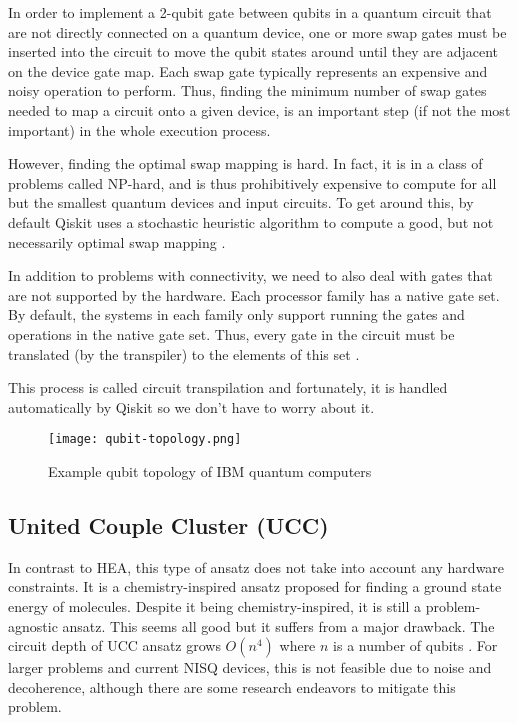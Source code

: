 In order to implement a 2-qubit gate between qubits in a quantum circuit that are not directly connected on a quantum device, one or more swap gates must be inserted into the circuit to move the qubit states around until they are adjacent on the device gate map. Each swap gate typically represents an expensive and noisy operation to perform. Thus, finding the minimum number of swap gates needed to map a circuit onto a given device, is an important step (if not the most important) in the whole execution process.

However, finding the optimal swap mapping is hard. In fact, it is in a class of problems called NP-hard, and is thus prohibitively expensive to compute for all but the smallest quantum devices and input circuits. To get around this, by default Qiskit uses a stochastic heuristic algorithm to compute a good, but not necessarily optimal swap mapping \cite{transpiler}. 

In addition to problems with connectivity, we need to also deal with gates that are not supported by the hardware. Each processor family has a native gate set. By default, the systems in each family only support running the gates and operations in the native gate set. Thus, every gate in the circuit must be translated (by the transpiler) to the elements of this set \cite{native_gates}.

This process is called circuit transpilation and fortunately, it is handled automatically by Qiskit so we don't have to worry about it. 
\begin{figure}[H]
    \texttt{[image: qubit-topology.png]}
    \caption{Example qubit topology of IBM quantum computers}
\end{figure}



\subsection{United Couple Cluster (UCC)}
In contrast to HEA, this type of ansatz does not take into account any hardware constraints. It is a chemistry-inspired ansatz proposed for finding a ground state energy of molecules. Despite it being chemistry-inspired, it is still a problem-agnostic ansatz. This seems all good but it suffers from a major drawback. The circuit depth of UCC ansatz grows $O(n^4)$ where $n$ is a number of qubits \cite{ucc_ansatz}. For larger problems and current NISQ devices, this is not feasible due to noise and decoherence, although there are some research endeavors to mitigate this problem.
  
